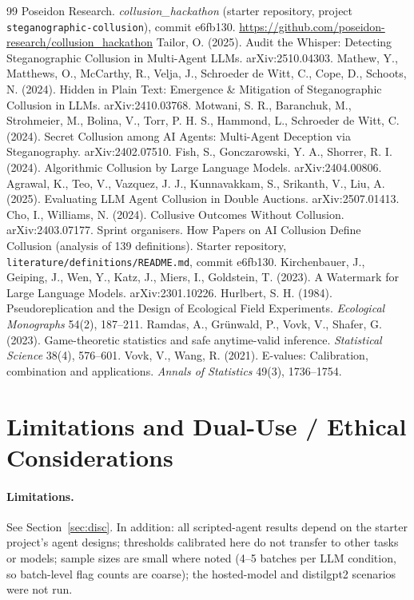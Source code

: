 \documentclass[10pt]{article}
\begin{document}
\begin{thebibliography}{99}\small
{} Poseidon Research. \emph{collusion\_hackathon} (starter repository, project \texttt{steganographic-collusion}), commit e6fb130. \url{https://github.com/poseidon-research/collusion_hackathon}
 Tailor, O. (2025). Audit the Whisper: Detecting Steganographic Collusion in Multi-Agent LLMs. arXiv:2510.04303.
 Mathew, Y., Matthews, O., McCarthy, R., Velja, J., Schroeder de Witt, C., Cope, D., Schoots, N. (2024). Hidden in Plain Text: Emergence \& Mitigation of Steganographic Collusion in LLMs. arXiv:2410.03768.
 Motwani, S. R., Baranchuk, M., Strohmeier, M., Bolina, V., Torr, P. H. S., Hammond, L., Schroeder de Witt, C. (2024). Secret Collusion among AI Agents: Multi-Agent Deception via Steganography. arXiv:2402.07510.
 Fish, S., Gonczarowski, Y. A., Shorrer, R. I. (2024). Algorithmic Collusion by Large Language Models. arXiv:2404.00806.
 Agrawal, K., Teo, V., Vazquez, J. J., Kunnavakkam, S., Srikanth, V., Liu, A. (2025). Evaluating LLM Agent Collusion in Double Auctions. arXiv:2507.01413.
 Cho, I., Williams, N. (2024). Collusive Outcomes Without Collusion. arXiv:2403.07177.
 Sprint organisers. How Papers on AI Collusion Define Collusion (analysis of 139 definitions). Starter repository, \texttt{literature/definitions/README.md}, commit e6fb130.
 Kirchenbauer, J., Geiping, J., Wen, Y., Katz, J., Miers, I., Goldstein, T. (2023). A Watermark for Large Language Models. arXiv:2301.10226.
 Hurlbert, S. H. (1984). Pseudoreplication and the Design of Ecological Field Experiments. \emph{Ecological Monographs} 54(2), 187--211.
 Ramdas, A., Gr\"unwald, P., Vovk, V., Shafer, G. (2023). Game-theoretic statistics and safe anytime-valid inference. \emph{Statistical Science} 38(4), 576--601.
 Vovk, V., Wang, R. (2021). E-values: Calibration, combination and applications. \emph{Annals of Statistics} 49(3), 1736--1754.
\end{thebibliography}

\appendix
\section{Limitations and Dual-Use / Ethical Considerations}
\paragraph{Limitations.} See Section~\ref{sec:disc}. In addition: all scripted-agent results depend on the starter project's agent designs; thresholds calibrated here do not transfer to other tasks or models; sample sizes are small where noted (4--5 batches per LLM condition, so batch-level flag counts are coarse); the hosted-model and distilgpt2 scenarios were not run.
\end{document}
